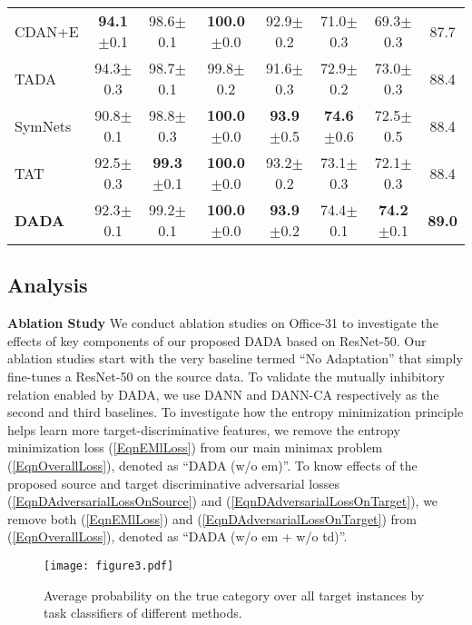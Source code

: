 \documentclass[letterpaper]{article} \usepackage{aaai20}  \usepackage{times}  \usepackage{helvet} \usepackage{courier}  \usepackage[hyphens]{url}  \usepackage{graphicx} \urlstyle{rm} \def\UrlFont{\rm}  \usepackage{graphicx}  \frenchspacing  \setlength{\pdfpagewidth}{8.5in}  \setlength{\pdfpageheight}{11in}
\begin{document}
\begin{table*}[!ht]
\begin{center}
{\begin{tabular}{lccccccc}
				CDAN+E \cite{cdan}  & \textbf{94.1}$\pm$0.1 & 98.6$\pm$0.1 & \textbf{100.0}$\pm$0.0 & 92.9$\pm$0.2 & 71.0$\pm$0.3 & 69.3$\pm$0.3 & 87.7 \\
				
				TADA \cite{tada}                & 94.3$\pm$0.3 & 98.7$\pm$0.1 & 99.8$\pm$0.2 & 91.6$\pm$0.3 & 72.9$\pm$0.2 & 73.0$\pm$0.3 & 88.4 \\
				
				SymNets \cite{symnets}          & 90.8$\pm$0.1 & 98.8$\pm$0.3 & \textbf{100.0}$\pm$0.0 & \textbf{93.9}$\pm$0.5 & \textbf{74.6}$\pm$0.6 & 72.5$\pm$0.5 & 88.4 \\
				
				TAT \cite{tat}                  & 92.5$\pm$0.3 & \textbf{99.3}$\pm$0.1 & \textbf{100.0}$\pm$0.0 & 93.2$\pm$0.2 & 73.1$\pm$0.3 & 72.1$\pm$0.3 & 88.4 \\
				\hline
				\textbf{DADA}              & 92.3$\pm$0.1 & 99.2$\pm$0.1 & \textbf{100.0}$\pm$0.0 & \textbf{93.9}$\pm$0.2 & 74.4$\pm$0.1 & \textbf{74.2}$\pm$0.1 & \textbf{89.0} \\
				\hline
			\end{tabular}
		}
	\end{center}
\end{table*}

\subsection{Analysis} 

\noindent\textbf{Ablation Study} We conduct ablation studies on Office-31 to investigate the effects of key components of our proposed DADA based on ResNet-50. Our ablation studies start with the very baseline termed ``No Adaptation'' that simply fine-tunes a ResNet-50 on the source data. To validate the mutually inhibitory relation enabled by DADA, we use DANN \cite{dann} and DANN-CA \cite{dann_ca} respectively as the second and third baselines. To investigate how the entropy minimization principle helps learn more target-discriminative features, we remove the entropy minimization loss (\ref{EqnEMlLoss}) from our main minimax problem (\ref{EqnOverallLoss}), denoted as ``DADA (w/o em)''. To know effects of the proposed source and target discriminative adversarial losses (\ref{EqnDAdversarialLossOnSource}) and (\ref{EqnDAdversarialLossOnTarget}), we remove both (\ref{EqnEMlLoss}) and (\ref{EqnDAdversarialLossOnTarget}) from (\ref{EqnOverallLoss}), denoted as ``DADA (w/o em + w/o td)''. 

\begin{figure}[t]
	\centering
	\texttt{[image: figure3.pdf]}
	\caption{Average probability on the true category over all target instances by task classifiers of different methods. 
	}
	\label{fig:avg_prob}
\end{figure}
\end{document}

